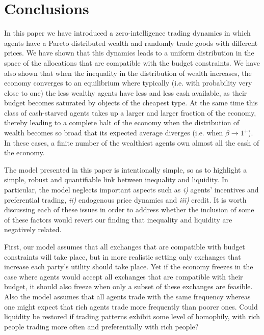 \section{Conclusions}
\label{sec:con}
In this paper we have introduced a zero-intelligence trading dynamics in which agents have a Pareto distributed  wealth and randomly trade goods with different prices. We have shown that this dynamics leads to a uniform distribution in the space of the allocations that are compatible with the budget constraints.  We have also shown that when the inequality in the distribution of wealth increases, the economy converges to an equilibrium where typically (i.e. with probability very close to one) the less wealthy agents have less and less cash available, as their budget becomes saturated by objects of the cheapest type. At the same time this class of cash-starved agents takes up a larger and larger fraction of the economy, thereby leading to a complete halt of the economy when the distribution of wealth becomes so broad that its expected average diverges (i.e. when $\beta \to 1^{+}$). In these cases, a finite number of the wealthiest agents own almost all the cash of the economy. 

The model presented in this paper is intentionally simple, so as to highlight a simple, robust and quantifiable link between inequality and liquidity. In particular, the model neglects important aspects such as {\em i)} agents' incentives and preferential trading, {\em ii)} endogenous price dynamics and {\em iii)} credit. 
It is worth discussing each of these issues in order to address whether the inclusion of some of these factors would revert our finding that inequality and liquidity are negatively related. 

First, our model assumes that all exchanges that are compatible with budget constraints will take place, but in more realistic setting only exchanges that increase each party's utility should take place. Yet if the economy freezes in the case where agents would accept all exchanges that are compatible with their budget, it should also freeze when only a subset of these exchanges are feasible. Also the model assumes that all agents trade with the same frequency whereas one might expect that rich agents trade more frequently than poorer ones. Could liquidity be restored if trading patterns exhibit some level of homophily, with rich people trading more often and preferentially with rich people? 

